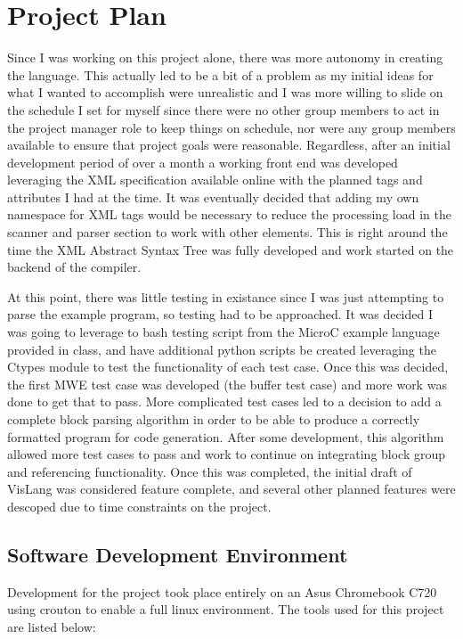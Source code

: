 \section{Project Plan}

Since I was working on this project alone, there was more autonomy in creating the
language. This actually led to be a bit of a problem as my initial ideas for what
I wanted to accomplish were unrealistic and I was more willing to slide on the schedule
I set for myself since there were no other group members to act in the project manager
role to keep things on schedule, nor were any group members available to ensure that
project goals were reasonable. Regardless, after an initial development period of over
a month a working front end was developed leveraging the XML specification available
online with the planned tags and attributes I had at the time. It was eventually decided
that adding my own namespace for XML tags would be necessary to reduce the processing
load in the scanner and parser section to work with other elements. This is right around
the time the XML Abstract Syntax Tree was fully developed and work started on the backend
of the compiler.
\par
At this point, there was little testing in existance since I was just attempting to parse
the example program, so testing had to be approached. It was decided I was going to
leverage to bash testing script from the MicroC example language provided in class, and
have additional python scripts be created leveraging the Ctypes module to test the
functionality of each test case. Once this was decided, the first MWE test case was
developed (the buffer test case) and more work was done to get that to pass. More
complicated test cases led to a decision to add a complete block parsing algorithm in
order to be able to produce a correctly formatted program for code generation. After
some development, this algorithm allowed more test cases to pass and work to continue
on integrating block group and referencing functionality. Once this was completed, the
initial draft of VisLang was considered feature complete, and several other planned
features were descoped due to time constraints on the project.

\subsection{Software Development Environment}

Development for the project took place entirely on an Asus Chromebook C720 using crouton
to enable a full linux environment. The tools used for this project are listed below:

